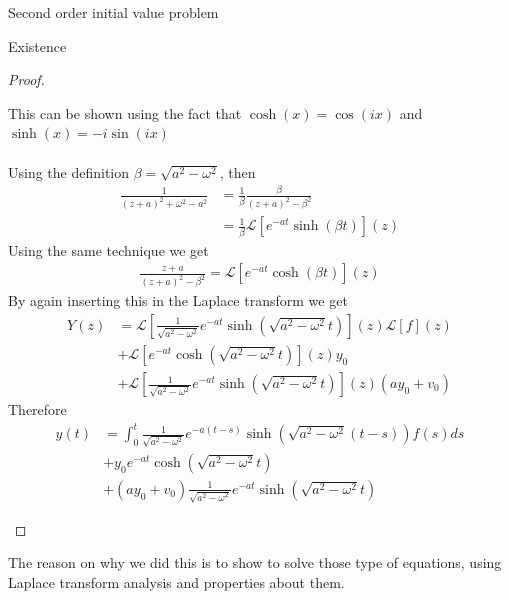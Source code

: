 \begin{parag}{Second order initial value problem}
\begin{subparag}{Existence}
\begin{proof}
\begin{enumerate}
						This can be shown using the fact that $\cosh\left(x\right) =  \cos\left(ix\right)$ and $\sinh\left(x\right) = -i\sin\left(ix\right)$\\
						$ $\\
						Using the definition $\beta =  \sqrt{a^2 - \omega^2}$, then 
						\begin{align*} 
							\frac{1}{\left(z + a\right)^2 + \omega^2 - a^2} &= \frac{1}{\beta} \frac{\beta}{\left(z + a\right)^2 - \beta^2}\\
							&= \frac{1}{\beta} \mathcal{L}\left[e^{-at}\sinh\left(\beta t\right)\right]\left(z\right)
						\end{align*}
						Using the same technique we get 
						\begin{align*} 
							\frac{z + a}{\left(z + a\right)^2 - \beta^2} = \mathcal{L}\left[e^{-at}\cosh\left(\beta t\right)\right]\left(z\right)
						\end{align*}
						By again inserting this in the Laplace transform we get 
						\begin{align*} 
							Y\left(z\right) &= \mathcal{L}\left[\frac{1}{\sqrt{a^2 - \omega^2}}e^{-at}\sinh\left(\sqrt{a^2 - \omega^2}t\right)\right]\left(z\right) \mathcal{L}\left[f\right]\left(z\right) \\
							&+ \mathcal{L}\left[e^{-at}\cosh\left(\sqrt{a^2 - \omega^2 }t\right)\right]\left(z\right)y_0 \\
							&+ \mathcal{L}\left[\frac{1}{\sqrt{a^2 - \omega^2}}e^{-at}\sinh\left(\sqrt{a^2 - \omega^2}t\right)\right]\left(z\right)\left(ay_0 + v_0\right)
						\end{align*}
						Therefore 
						\begin{align*} 
							y\left(t\right) &= \int_0^{t} \frac{1}{\sqrt{a^2- \omega^2}} e^{-a\left(t-s\right)}\sinh\left(\sqrt{a^2 -\omega^2}\left(t-s\right)\right)f\left(s\right) ds \\
							&+y_0 e^{-at} \cosh\left(\sqrt{a^2 - \omega^2}t\right)\\
							&+ \left(ay_0 + v_0\right)\frac{1}{\sqrt{a^2 - \omega^2}}e^{-at}\sinh\left(\sqrt{a^2 - \omega^2}t\right)
						\end{align*}
				\end{enumerate}
				
		    \end{proof}
		\end{subparag}
		The reason on why we did this is to show  to solve those type of equations, using Laplace transform analysis and properties about them.
\end{parag}





